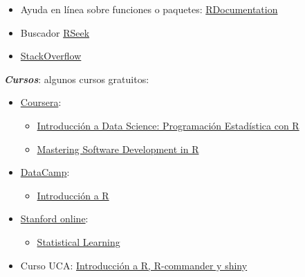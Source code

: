 \documentclass[]{book}
\providecommand{\tightlist}{%
  \setlength{\itemsep}{0pt}\setlength{\parskip}{0pt}}
\begin{document}
\begin{itemize}
\item
  Ayuda en línea sobre funciones o paquetes:
  \href{https://www.rdocumentation.org/}{RDocumentation}
\item
  Buscador \href{http://rseek.org/}{RSeek}
\item
  \href{http://stackoverflow.com/questions/tagged/r}{StackOverflow}
\end{itemize}

\textbf{\emph{Cursos}}: algunos cursos gratuitos:

\begin{itemize}
\item
  \href{https://www.coursera.org/}{Coursera}:

  \begin{itemize}
  \item
    \href{https://www.coursera.org/learn/intro-data-science-programacion-estadistica-r}{Introducción
    a Data Science: Programación Estadística con R}
  \item
    \href{https://www.coursera.org/specializations/r}{Mastering Software
    Development in R}
  \end{itemize}
\end{itemize}

\begin{itemize}
\item
  \href{https://www.datacamp.com/courses}{DataCamp}:

  \begin{itemize}
  \tightlist
  \item
    \href{https://www.datacamp.com/courses/introduccion-a-r/}{Introducción
    a R}
  \end{itemize}
\end{itemize}

\begin{itemize}
\item
  \href{http://online.stanford.edu/courses}{Stanford online}:

  \begin{itemize}
  \tightlist
  \item
    \href{http://online.stanford.edu/course/statistical-learning}{Statistical
    Learning}
  \end{itemize}
\end{itemize}

\begin{itemize}
\tightlist
\item
  Curso UCA:
  \href{http://knuth.uca.es/moodle/course/view.php?id=51}{Introducción a
  R, R-commander y shiny}
\end{itemize}
\end{document}

